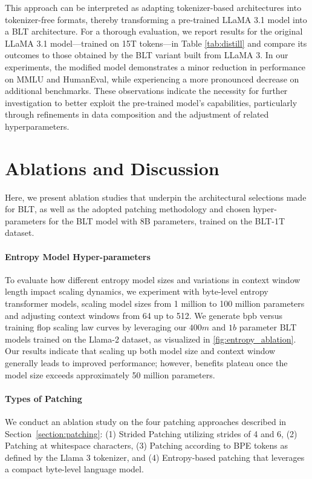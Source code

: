This approach can be interpreted as adapting tokenizer-based architectures into tokenizer-free formats, thereby transforming a pre-trained LLaMA 3.1 model into a {\textsc BLT} architecture. For a thorough evaluation, we report results for the original LLaMA 3.1 model—trained on 15T tokens—in Table \ref{tab:distill} and compare its outcomes to those obtained by the {\textsc BLT} variant built from LLaMA 3. In our experiments, the modified model demonstrates a minor reduction in performance on MMLU and HumanEval, while experiencing a more pronounced decrease on additional benchmarks. These observations indicate the necessity for further investigation to better exploit the pre-trained model’s capabilities, particularly through refinements in data composition and the adjustment of related hyperparameters.

\section{Ablations and Discussion}
\label{section:ablations}
Here, we present ablation studies that underpin the architectural selections made for {\textsc BLT}, as well as the adopted patching methodology and chosen hyper-parameters for the {\textsc BLT} model with 8B parameters, trained on the {\textsc BLT}-1T dataset.

\paragraph{Entropy Model Hyper-parameters} To evaluate how different entropy model sizes and variations in context window length impact scaling dynamics, we experiment with byte-level entropy transformer models, scaling model sizes from 1 million to 100 million parameters and adjusting context windows from 64 up to 512. We generate bpb versus training flop scaling law curves by leveraging our $400m$ and $1b$ parameter {\textsc BLT} models trained on the Llama-2 dataset, as visualized in \autoref{fig:entropy_ablation}. Our results indicate that scaling up both model size and context window generally leads to improved performance; however, benefits plateau once the model size exceeds approximately 50 million parameters.

\paragraph{Types of Patching}

We conduct an ablation study on the four patching approaches described in Section~\ref{section:patching}: (1) Strided Patching utilizing strides of 4 and 6, (2) Patching at whitespace characters, (3) Patching according to BPE tokens as defined by the Llama 3 tokenizer, and (4) Entropy-based patching that leverages a compact byte-level language model.

